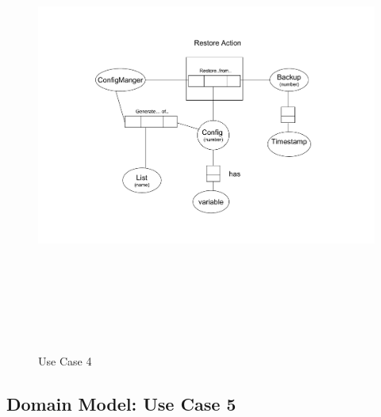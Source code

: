 \begin{figure}[htbp]
  \centering
  \includegraphics[angle=0,width=15cm,height=15cm]{"domainmodel-usecase4"}
  \caption{Use Case 4}
  \label{fig:usecase4}
\end{figure}

\newpage
\subsection{Domain Model: Use Case 5}

